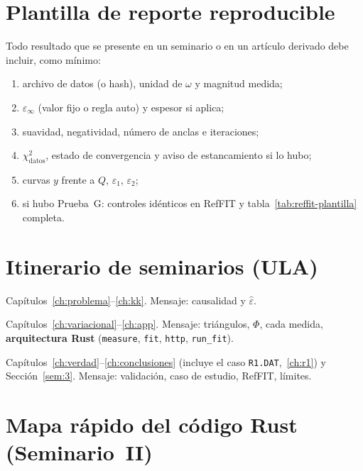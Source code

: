 \chapter{Plantilla de reporte reproducible}
\label{ap:reporte}

Todo resultado que se presente en un seminario o en un art\'iculo derivado debe incluir, como m\'inimo:

\begin{enumerate}[leftmargin=*]
\item archivo de datos (o hash), unidad de $\omega$ y magnitud medida;
\item $\varepsilon_\infty$ (valor fijo o regla auto) y espesor si aplica;
\item suavidad, negatividad, n\'umero de anclas e iteraciones;
\item $\chi^{2}_{\mathrm{datos}}$, estado de convergencia y aviso de estancamiento si lo hubo;
\item curvas $y$ frente a $Q$, $\varepsilon_1$, $\varepsilon_2$;
\item si hubo Prueba~G: controles id\'enticos en RefFIT y tabla~\ref{tab:reffit-plantilla} completa.
\end{enumerate}

\chapter{Itinerario de seminarios (ULA)}
\label{ap:seminarios}

\begin{description}[style=nextline,leftmargin=1.2cm]
\item[Seminario~I.]
Cap\'itulos~\ref{ch:problema}--\ref{ch:kk}. Mensaje: causalidad y $\hat\varepsilon$.
\item[Seminario~II.]
Cap\'itulos~\ref{ch:variacional}--\ref{ch:app}. Mensaje: tri\'angulos, $\Phi$, cada medida, \textbf{arquitectura Rust} (\texttt{measure}, \texttt{fit}, \texttt{http}, \texttt{run\_fit}).
\item[Seminario~III (final).]
Cap\'itulos~\ref{ch:verdad}--\ref{ch:conclusiones} (incluye el caso \texttt{R1.DAT},~\ref{ch:r1}) y Secci\'on~\ref{sem:3}. Mensaje: validaci\'on, caso de estudio, RefFIT, l\'imites.
\end{description}

\chapter{Mapa r\'apido del c\'odigo Rust (Seminario~II)}
\label{ap:rust}

